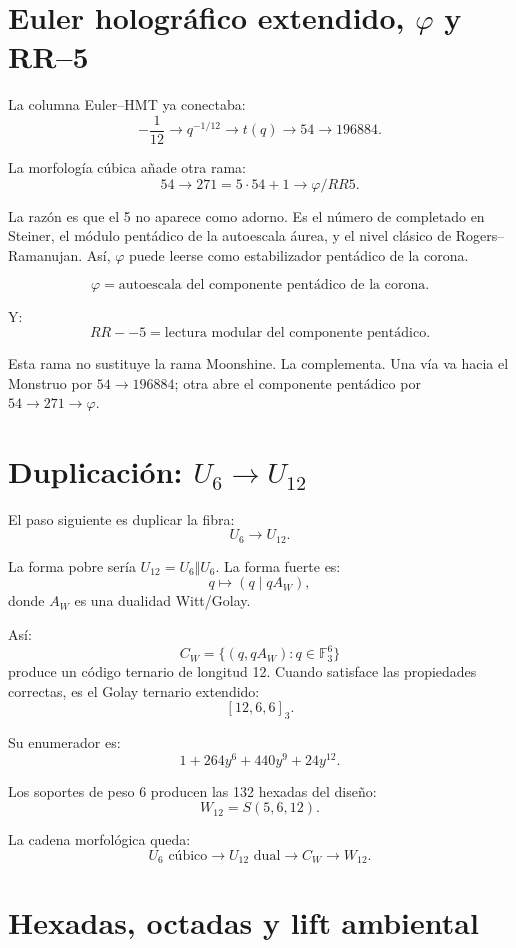 \documentclass[11pt,a4paper]{article}
\theoremstyle{definition}
\theoremstyle{remark}
\newcommand{\F}{\mathbb F}
\begin{document}
\section{Euler holográfico extendido, \(\varphi\) y RR--5}

La columna Euler--HMT ya conectaba:
\[
-\frac1{12}\to q^{-1/12}\to t(q)\to54\to196884.
\]

La morfología cúbica añade otra rama:
\[
54\to271=5\cdot54+1\to \varphi/RR5.
\]

La razón es que el 5 no aparece como adorno. Es el número de completado en Steiner, el módulo pentádico de la autoescala áurea, y el nivel clásico de Rogers--Ramanujan. Así, \(\varphi\) puede leerse como estabilizador pentádico de la corona.

\[
\boxed{
\varphi=\text{autoescala del componente pentádico de la corona}.}
\]

Y:
\[
\boxed{
RR--5=\text{lectura modular del componente pentádico}.}
\]

Esta rama no sustituye la rama Moonshine. La complementa. Una vía va hacia el Monstruo por \(54\to196884\); otra abre el componente pentádico por \(54\to271\to\varphi\).

\section{Duplicación: \(U_6\to U_{12}\)}

El paso siguiente es duplicar la fibra:
\[
U_6\longrightarrow U_{12}.
\]

La forma pobre sería \(U_{12}=U_6\Vert U_6\). La forma fuerte es:
\[
q\longmapsto(q\mid qA_W),
\]
donde \(A_W\) es una dualidad Witt/Golay.

Así:
\[
C_W=\{(q,qA_W):q\in\F_3^6\}
\]
produce un código ternario de longitud 12. Cuando satisface las propiedades correctas, es el Golay ternario extendido:
\[
[12,6,6]_3.
\]

Su enumerador es:
\[
1+264y^6+440y^9+24y^{12}.
\]

Los soportes de peso 6 producen las 132 hexadas del diseño:
\[
W_{12}=S(5,6,12).
\]

La cadena morfológica queda:
\[
\boxed{
U_6\text{ cúbico}\to U_{12}\text{ dual}\to C_W\to W_{12}.
}
\]

\section{Hexadas, octadas y lift ambiental}
\end{document}
